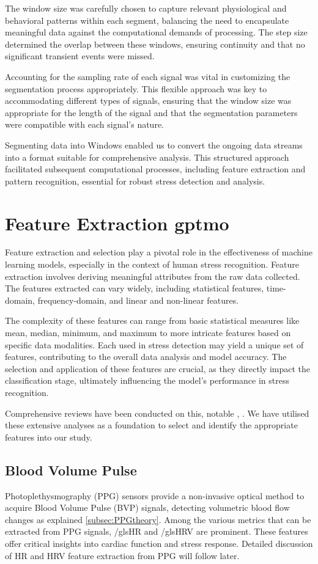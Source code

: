 The window size was carefully chosen to capture relevant physiological and behavioral patterns within each segment, balancing the need to encapsulate meaningful data against the computational demands of processing. The step size determined the overlap between these windows, ensuring continuity and that no significant transient events were missed.

Accounting for the sampling rate of each signal was vital in customizing the segmentation process appropriately. This flexible approach was key to accommodating different types of signals, ensuring that the window size was appropriate for the length of the signal and that the segmentation parameters were compatible with each signal's nature.

Segmenting data into Windows enabled us to convert the ongoing data streams into a format suitable for comprehensive analysis. This structured approach facilitated subsequent computational processes, including feature extraction and pattern recognition, essential for robust stress detection and analysis.

\section{Feature Extraction \gls*{gptmo}}
Feature extraction and selection play a pivotal role in the effectiveness of machine learning models, especially in the context of human stress recognition. Feature extraction involves deriving meaningful attributes from the raw data collected. The features extracted can vary widely, including statistical features, time-domain, frequency-domain, and linear and non-linear features.

The complexity of these features can range from basic statistical measures like mean, median, minimum, and maximum to more intricate features based on specific data modalities. Each used in stress detection may yield a unique set of features, contributing to the overall data analysis and model accuracy. The selection and application of these features are crucial, as they directly impact the classification stage, ultimately influencing the model's performance in stress recognition.

Comprehensive reviews have been conducted on this, notable \textcite{review1}, \textcite{arsalan}. We have utilised these extensive analyses as a foundation to select and identify the appropriate features into our study.


\subsection{Blood Volume Pulse}
Photoplethysmography (PPG) sensors provide a non-invasive optical method to acquire Blood Volume Pulse (BVP) signals, detecting volumetric blood flow changes as explained \autoref*{subsec:PPGtheory}. Among the various metrics that can be extracted from PPG signals, /gls{HR} and  /gls{HRV} are prominent. These features offer critical insights into cardiac function and stress response. Detailed discussion of HR and HRV feature extraction from PPG will follow later.

